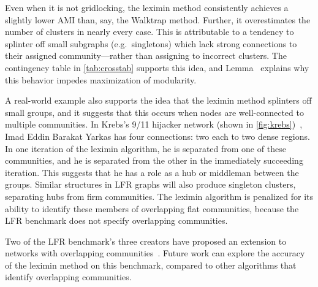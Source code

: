 Even when it is not gridlocking, the leximin method consistently achieves a slightly lower AMI than, say, the Walktrap method. Further, it overestimates the number of clusters in nearly every case. This is attributable to a tendency to splinter off small subgraphs (e.g.\ singletons) which lack strong connections to their assigned community---rather than assigning to incorrect clusters. The contingency table in \autoref{tab:crosstab} supports this idea, and Lemma~\label{lemma:modularity} explains why this behavior impedes maximization of modularity.

A real-world example also supports the idea that the leximin method splinters off small groups, and it suggests that this occurs when nodes are well-connected to multiple communities. In Krebs's 9/11 hijacker network (shown in \autoref{fig:krebs})~\cite{krebs2002uncloaking}, Imad Eddin Barakat Yarkas has four connections: two each to two dense regions. In one iteration of the leximin algorithm, he is separated from one of these communities, and he is separated from the other in the immediately succeeding iteration. This suggests that he has a role as a hub or middleman between the groups. Similar structures in LFR graphs will also produce singleton clusters, separating hubs from firm communities. The leximin algorithm is penalized for its ability to identify these members of overlapping flat communities, because the LFR benchmark does not specify overlapping communities. 

Two of the LFR benchmark's three creators have proposed an extension to networks with overlapping communities~\cite{lancichinetti2009benchmarks}. Future work can explore the accuracy of the leximin method on this benchmark, compared to other algorithms that identify overlapping communities.

